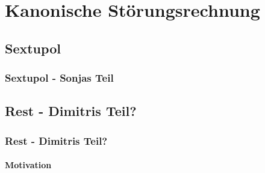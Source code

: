 \documentclass[hyperref={pdfpagelabels=false}]{beamer}
\begin{document}
\section{Kanonische Störungsrechnung}
\begin{frame}
\tableofcontents[currentsection]
\end{frame}
\subsection{Sextupol}
\begin{frame}
\frametitle{Sextupol - Sonjas Teil}
\end{frame}
\subsection*{Rest - Dimitris Teil?}
\begin{frame}
\frametitle{Rest - Dimitris Teil?}
 \framesubtitle{Motivation}
\end{frame}
\end{document}
